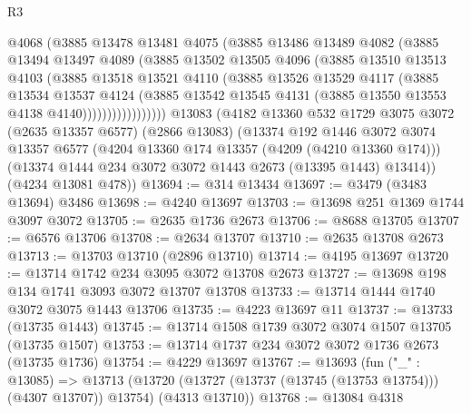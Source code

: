 \begin{lexlean}{R3}
\begin{coremodule}
                  @4068
                  (@3885
                    @13478
                    @13481
                    @4075
                    (@3885
                      @13486
                      @13489
                      @4082
                      (@3885
                        @13494
                        @13497
                        @4089
                        (@3885
                          @13502
                          @13505
                          @4096
                          (@3885
                            @13510
                            @13513
                            @4103
                            (@3885
                              @13518
                              @13521
                              @4110
                              (@3885
                                @13526
                                @13529
                                @4117
                                (@3885
                                  @13534
                                  @13537
                                  @4124
                                  (@3885
                                    @13542
                                    @13545
                                    @4131
                                    (@3885 @13550 @13553 @4138 @4140)))))))))))))))))
    @13083
    (@4182
      @13360
      @532
      @1729
      @3075
      @3072
      (@2635 @13357 @6577)
      (@2866 @13083)
      (@13374
        @192
        @1446
        @3072
        @3074
        @13357
        @6577
        (@4204 @13360 @174 @13357 (@4209 (@4210 @13360 @174)))
        (@13374 @1444 @234 @3072 @3072 @1443 @2673 (@13395 @1443) @13414))
      (@4234 @13081 @478))
@13694 := @314 @13434
@13697 := @3479 (@3483 @13694) @3486
@13698 := @4240 @13697
@13703 := @13698 @251 @1369 @1744 @3097 @3072
@13705 := @2635 @1736 @2673
@13706 := @8688 @13705
@13707 := @6576 @13706
@13708 := @2634 @13707
@13710 := @2635 @13708 @2673
@13713 := @13703 @13710 (@2896 @13710)
@13714 := @4195 @13697
@13720 := @13714 @1742 @234 @3095 @3072 @13708 @2673
@13727 := @13698 @198 @134 @1741 @3093 @3072 @13707 @13708
@13733 := @13714 @1444 @1740 @3072 @3075 @1443 @13706
@13735 := @4223 @13697 @11
@13737 := @13733 (@13735 @1443)
@13745 := @13714 @1508 @1739 @3072 @3074 @1507 @13705 (@13735 @1507)
@13753 := @13714 @1737 @234 @3072 @3072 @1736 @2673 (@13735 @1736)
@13754 := @4229 @13697
@13767 := @13693
    (fun ("_" : @13085) =>
    @13713 (@13720 (@13727 (@13737 (@13745 (@13753 @13754))) (@4307 @13707)) @13754) (@4313 @13710))
@13768 := @13084 @4318

\end{coremodule}
\end{lexlean}
